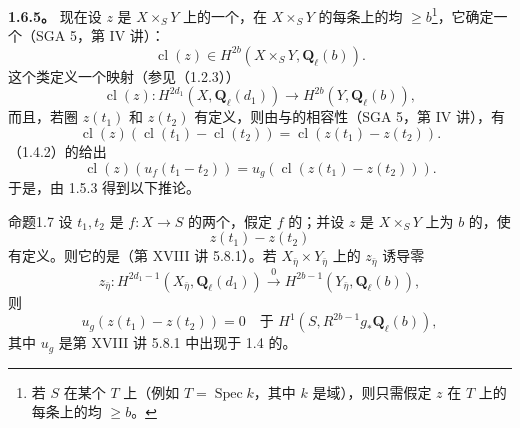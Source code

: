 \textbf{1.6.5。} 现在设 $z$ 是 $X\times_S Y$ 上的一个，在 $X\times_S Y$ 的每条上的均 $\geq b$\footnote{若 $S$ 在某个 $T$ 上（例如 $T=\operatorname{Spec}k$，其中 $k$ 是域），则只需假定 $z$ 在 $T$ 上的每条上的均 $\geq b$。}，它确定一个（SGA 5，第 IV 讲）：
\begin{equation}\tag{1.6.6}
\operatorname{cl}(z)\in H^{2b}(X\times_S Y,\mathbf Q_\ell(b)).
\end{equation}
这个类定义一个映射（参见（1.2.3））
\begin{equation}\tag{1.6.7}
\operatorname{cl}(z):H^{2d_1}(X,\mathbf Q_\ell(d_1))\longrightarrow H^{2b}(Y,\mathbf Q_\ell(b)),
\end{equation}
而且，若圈 $z(t_1)$ 和 $z(t_2)$ 有定义，则由与的相容性（SGA 5，第 IV 讲），有
\begin{equation}\tag{1.6.8}
\operatorname{cl}(z)(\operatorname{cl}(t_1)-\operatorname{cl}(t_2))=\operatorname{cl}(z(t_1)-z(t_2)).
\end{equation}
（1.4.2）的给出
\begin{equation}\tag{1.6.9}
\operatorname{cl}(z)(u_f(t_1-t_2))=u_g(\operatorname{cl}(z(t_1)-z(t_2))).
\end{equation}
于是，由 1.5.3 得到以下推论。
\begin{SGAresult}{命题}{1.7}
设 $t_1,t_2$ 是 $f:X\to S$ 的两个，假定 $f$ 的；并设 $z$ 是 $X\times_S Y$ 上为 $b$ 的，使
\begin{equation}\tag{1.7.1}
z(t_1)-z(t_2)
\end{equation}
有定义。则它的是（第 XVIII 讲 5.8.1）。若 $X_{\bar\eta}\times Y_{\bar\eta}$ 上的 $z_{\bar\eta}$ 诱导零
\begin{equation}\tag{1.7.2}
z_{\bar\eta}:H^{2d_1-1}(X_{\bar\eta},\mathbf Q_\ell(d_1))\xrightarrow{\ 0\ }H^{2b-1}(Y_{\bar\eta},\mathbf Q_\ell(b)),
\end{equation}
则
\begin{equation}\tag{1.7.3}
u_g(z(t_1)-z(t_2))=0\quad\text{于 }H^1(S,R^{2b-1}g_*\mathbf Q_\ell(b)),
\end{equation}
其中 $u_g$ 是第 XVIII 讲 5.8.1 中出现于 1.4 的。
\end{SGAresult}

